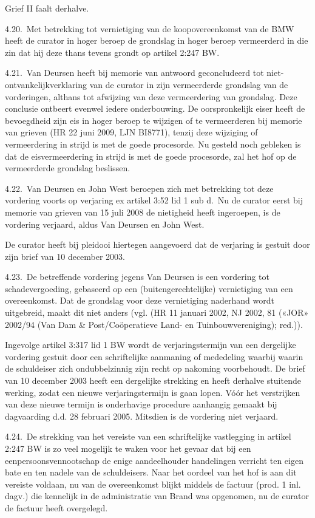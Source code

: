 \documentclass[
  dutch,
  a4paper,
]{article}
\begin{document}
Grief II faalt derhalve.

4.20. Met betrekking tot vernietiging van de koopovereenkomst van de BMW heeft de curator in hoger beroep de grondslag in hoger beroep vermeerderd in die zin dat hij deze thans tevens grondt op artikel 2:247 BW.

4.21. Van Deursen heeft bij memorie van antwoord geconcludeerd tot niet-ontvankelijkverklaring van de curator in zijn vermeerderde grondslag van de vorderingen, althans tot afwijzing van deze vermeerdering van grondslag. Deze conclusie ontbeert evenwel iedere onderbouwing. De oorspronkelijk eiser heeft de bevoegdheid zijn eis in hoger beroep te wijzigen of te vermeerderen bij memorie van grieven (HR 22 juni 2009, LJN BI8771), tenzij deze wijziging of vermeerdering in strijd is met de goede procesorde. Nu gesteld noch gebleken is dat de eisvermeerdering in strijd is met de goede procesorde, zal het hof op de vermeerderde grondslag beslissen.

4.22. Van Deursen en John West beroepen zich met betrekking tot deze vordering voorts op verjaring ex artikel 3:52 lid 1 sub d.~Nu de curator eerst bij memorie van grieven van 15 juli 2008 de nietigheid heeft ingeroepen, is de vordering verjaard, aldus Van Deursen en John West.

De curator heeft bij pleidooi hiertegen aangevoerd dat de verjaring is gestuit door zijn brief van 10 december 2003.

4.23. De betreffende vordering jegens Van Deursen is een vordering tot schadevergoeding, gebaseerd op een (buitengerechtelijke) vernietiging van een overeenkomst. Dat de grondslag voor deze vernietiging naderhand wordt uitgebreid, maakt dit niet anders (vgl. (HR 11 januari 2002, NJ 2002, 81 («JOR» 2002/94 (Van Dam \& Post/Coöperatieve Land- en Tuinbouwvereniging); red.)).

Ingevolge artikel 3:317 lid 1 BW wordt de verjaringstermijn van een dergelijke vordering gestuit door een schriftelijke aanmaning of mededeling waarbij waarin de schuldeiser zich ondubbelzinnig zijn recht op nakoming voorbehoudt. De brief van 10 december 2003 heeft een dergelijke strekking en heeft derhalve stuitende werking, zodat een nieuwe verjaringstermijn is gaan lopen. Vóór het verstrijken van deze nieuwe termijn is onderhavige procedure aanhangig gemaakt bij dagvaarding d.d. 28 februari 2005. Mitsdien is de vordering niet verjaard.

4.24. De strekking van het vereiste van een schriftelijke vastlegging in artikel 2:247 BW is zo veel mogelijk te waken voor het gevaar dat bij een eenpersoonsvennootschap de enige aandeelhouder handelingen verricht ten eigen bate en ten nadele van de schuldeisers. Naar het oordeel van het hof is aan dit vereiste voldaan, nu van de overeenkomst blijkt middels de factuur (prod. 1 inl. dagv.) die kennelijk in de administratie van Brand was opgenomen, nu de curator de factuur heeft overgelegd.
\end{document}
